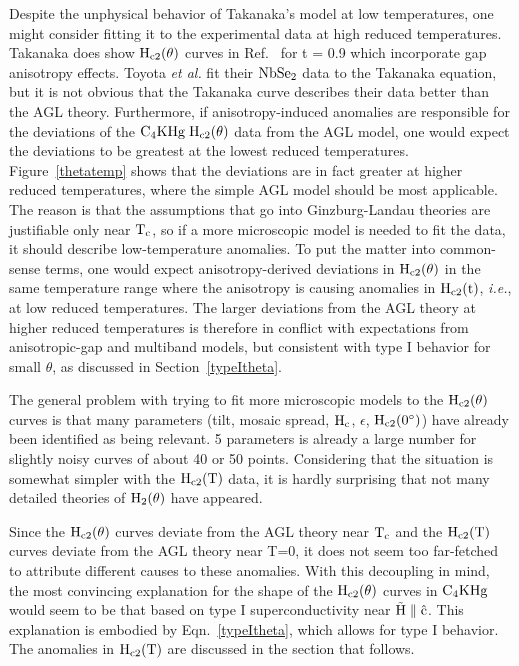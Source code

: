         Despite  the  unphysical  behavior    of   Takanaka's model at  low
temperatures,  one might consider  fitting it  to the experimental  data at
high reduced temperatures.  Takanaka does show  $\rm H_{c2}(\theta)$ curves
in Ref.~\cite{takanaka75}  for t  = 0.9 which  incorporate  gap  anisotropy
effects.  Toyota {\em et al.}\cite{toyota76} fit their $\rm NbSe_2$ data to
the  Takanaka  equation, but  it  is  not obvious  that  the Takanaka curve
describes   their  data  better than   the    AGL theory.  Furthermore,  if
anisotropy-induced anomalies are responsible for the deviations of the $\rm
C_4KHg \;  H_{c2}(\theta)$ data from  the AGL model,  one would  expect the
deviations  to     be       greatest   at    the      lowest        reduced
temperatures.\cite{youngner80}   Figure~\ref{thetatemp}  shows  that      the
deviations  are in fact greater at  higher reduced temperatures,  where the
simple  AGL model should  be  most  applicable.   The reason   is that  the
assumptions that go into Ginzburg-Landau theories are justifiable only near
$\rm T_c$,\cite{tinkham80} so if a more microscopic model  is needed to fit
the data, it should describe  low-temperature anomalies.  To put the matter
into common-sense terms, one would  expect anisotropy-derived deviations in
$\rm H_{c2}(\theta)$ in the same temperature range where  the anisotropy is
causing   anomalies in  $\rm    H_{c2}(t)$, {\em    i.e.}, at  low   reduced
temperatures.  The larger deviations from the  AGL theory at higher reduced
temperatures   is  therefore   in    conflict    with  expectations    from
anisotropic-gap and multiband  models, but consistent with type  I behavior
for small $\theta$, as discussed in Section~\ref{typeItheta}.

        The general problem with trying  to fit more  microscopic models to
the  $\rm H_{c2}(\theta)$  curves  is that  many parameters  (tilt,  mosaic
spread, $\rm H_c$, $\epsilon$, $\rm  H_{c2}(0^{\circ})$) have  already been
identified as being relevant.  5  parameters is already  a large number for
slightly noisy  curves  of  about 40  or  50 points.  Considering  that the
situation is  somewhat simpler with the  $\rm H_{c2}(T)$ data, it is hardly
surprising that not  many  detailed theories  of $\rm   H_{2}(\theta)$ have
appeared.

        Since the $\rm  H_{c2}(\theta)$ curves deviate  from the AGL theory
near $\rm T_c$ and the  $\rm H_{c2}(T)$  curves deviate from the AGL theory
near T=0, it does not seem too far-fetched to attribute different causes to
these anomalies.    With this   decoupling in  mind,   the  most convincing
explanation for the shape of the $\rm H_{c2}(\theta)$ curves in $\rm C_4KHg
$ would seem to be that based on type I superconductivity near $\rm \vec{H}
\parallel \hat{c}$.  This explanation is embodied by Eqn.~\ref{typeItheta},
which allows for  type I behavior.  The anomalies  in $\rm H_{c2}(T)$  are
discussed in the section that follows. 
